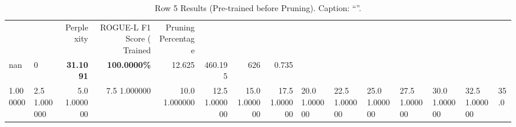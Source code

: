 \begin{table}
\caption{Row 5 Results (Pre-trained before Pruning). \ifshowcaption{}Caption: ``''.\fi}
\label{tab:evaluation-pipeline-5-trained}
\begin{tabular}{llrrrrrr}
 &  & Perplexity & ROGUE-L F1 Score (%
Trained & Pruning Percentage &  &  &  &  &  &  \\
nan & 0 & \bfseries 31.1091 & \bfseries 100.0000\% & 12.625 & 460.195 & 626 & 0.735 \\
1.000000 & 2.5%
1.000000 & 5.0%
1.000000 & 7.5%
1.000000 & 10.0%
1.000000 & 12.5%
1.000000 & 15.0%
1.000000 & 17.5%
1.000000 & 20.0%
1.000000 & 22.5%
1.000000 & 25.0%
1.000000 & 27.5%
1.000000 & 30.0%
1.000000 & 32.5%
1.000000 & 35.0%

\end{tabular}
\end{table}
